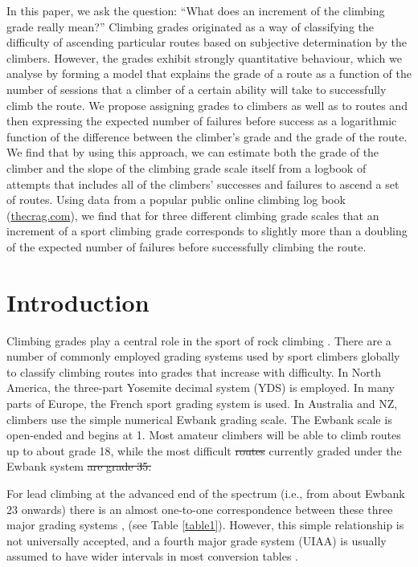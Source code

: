\documentclass[12pt]{article}
\providecommand{\DIFaddtex}[1]{{\protect\color{blue}\uwave{#1}}} %
\providecommand{\DIFdeltex}[1]{{\protect\color{red}\sout{#1}}}                      %
\providecommand{\DIFaddbegin}{} %
\providecommand{\DIFaddend}{} %
\providecommand{\DIFdelbegin}{} %
\providecommand{\DIFdelend}{} %
\providecommand{\DIFadd}[1]{\texorpdfstring{\DIFaddtex{#1}}{#1}} %
\providecommand{\DIFdel}[1]{\texorpdfstring{\DIFdeltex{#1}}{}} %
\newcommand{\DIFscaledelfig}{0.5}
\newlength{\DIFdelgraphicswidth} %
\newlength{\DIFdelgraphicsheight} %
\newcommand{\DIFaddincludegraphics}[2][]{{\color{blue}\fbox{\DIFOincludegraphics[#1]{#2}}}} %
\newcommand{\DIFdelincludegraphics}[2][]{%
\sbox{\DIFdelgraphicsbox}{\DIFOincludegraphics[#1]{#2}}%
\settoboxwidth{\DIFdelgraphicswidth}{\DIFdelgraphicsbox} %
\settoboxtotalheight{\DIFdelgraphicsheight}{\DIFdelgraphicsbox} %
\scalebox{\DIFscaledelfig}{%
\parbox[b]{\DIFdelgraphicswidth}{\usebox{\DIFdelgraphicsbox}\\[-\baselineskip] \rule{\DIFdelgraphicswidth}{0em}}\llap{\resizebox{\DIFdelgraphicswidth}{\DIFdelgraphicsheight}{%
\setlength{\unitlength}{\DIFdelgraphicswidth}%
\begin{picture}(1,1)%
\thicklines\linethickness{2pt} %
{\color[rgb]{1,0,0}\put(0,0){\framebox(1,1){}}}%
{\color[rgb]{1,0,0}\put(0,0){\line( 1,1){1}}}%
{\color[rgb]{1,0,0}\put(0,1){\line(1,-1){1}}}%
\end{picture}%
}\hspace*{3pt}}} %
} %
\DeclareRobustCommand{\DIFaddbegin}{\DIFOaddbegin \let\includegraphics\DIFaddincludegraphics} %
\DeclareRobustCommand{\DIFaddend}{\DIFOaddend \let\includegraphics\DIFOincludegraphics} %
\DeclareRobustCommand{\DIFdelbegin}{\DIFOdelbegin \let\includegraphics\DIFdelincludegraphics} %
\DeclareRobustCommand{\DIFdelend}{\DIFOaddend \let\includegraphics\DIFOincludegraphics} %
\begin{document}
In this paper, we ask the question: ``What does an increment of the climbing grade really mean?''  Climbing grades originated as a way of classifying the difficulty of ascending particular routes based on subjective determination by the climbers.  However, the grades exhibit strongly quantitative behaviour, which we analyse by forming a model that explains the grade of a route as a function of the number of sessions that a climber of a certain ability will take to successfully climb the route. We propose assigning grades to climbers as well as to routes and then expressing the expected number of failures before success as a logarithmic function of the difference between the climber's grade and the grade of the route.  We find that by using this approach, we can estimate both the grade of the climber and the slope of the climbing grade scale itself from a logbook of attempts that includes all of the climbers' successes and failures to ascend a set of routes.  Using data from a popular public online climbing log book (\url{thecrag.com}), we find that for three different climbing grade scales that an increment of a sport climbing grade corresponds to slightly more than a doubling of the expected number of failures before successfully climbing the route.

\section{Introduction}

Climbing grades play a central role in the sport of rock climbing \citep{delignieres1993psychophysical,draper2015comparative}. There are a number of commonly employed grading systems used by sport climbers globally to classify climbing routes into grades that increase with difficulty.  In North America, the three-part Yosemite decimal system (YDS) is employed.  In many parts of Europe, the French sport grading system is used.  In Australia and NZ, climbers use the simple numerical Ewbank grading scale. The Ewbank scale is open-ended and begins at 1. Most amateur climbers will be able to climb routes up to about grade 18, while the most difficult \DIFdelbegin \DIFdel{routes }\DIFdelend \DIFaddbegin \DIFadd{route }\DIFaddend currently graded under the Ewbank system \DIFdelbegin \DIFdel{are grade 35.
}\DIFdelend \DIFaddbegin \DIFadd{is grade 36 (as proposed by the first ascensionist). 
}\DIFaddend 

For lead climbing at the advanced end of the spectrum (i.e., from about Ewbank 23 onwards) there is an almost one-to-one correspondence between these three major grading systems \citep{draper2015comparative}, (see Table \ref{table1}).  However, this simple relationship is not universally accepted, and a fourth major grade system (UIAA) is usually assumed to have wider intervals in most conversion tables \citep{draper2015comparative}.
\end{document}
